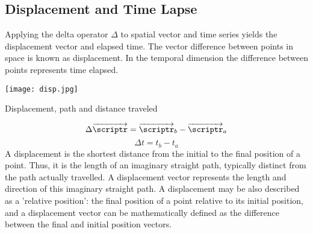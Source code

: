 \subsection{Displacement and Time Lapse}
Applying the delta operator $\Delta$ to spatial vector and time series yields the displacement vector and elapsed time.  The vector difference between points in space is known as displacement.  In the temporal dimension the difference between points represents time elapsed.
\begin{marginfigure}[0pt]%
  \texttt{[image: disp.jpg]}
  \caption{Displacement, path and distance traveled}
  \label{fig:marginfig}
\end{marginfigure}
$$\Delta \overrightarrow{\scriptr}=\overrightarrow{\scriptr}_b-\overrightarrow{\scriptr}_a$$
$$\Delta t = t_b-t_a$$
A displacement is the shortest distance from the initial to the final position of a point.  Thus, it is the length of an imaginary straight path, typically distinct from the path actually travelled. A displacement vector represents the length and direction of this imaginary straight path.  A displacement may be also described as a 'relative position': the final position of a point relative to its initial position, and a displacement vector can be mathematically defined as the difference between the final and initial position vectors.




